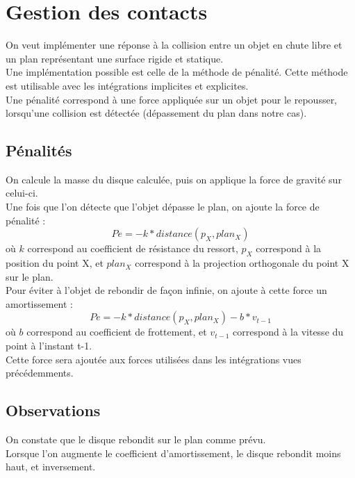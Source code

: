 \documentclass[a4paper]{article}
\begin{document}
\section{Gestion des contacts}

On veut implémenter une réponse à la collision entre un objet en chute libre et un plan représentant une surface rigide et statique.\\

Une implémentation possible est celle de la méthode de pénalité. Cette méthode est utilisable avec les intégrations implicites et explicites.\\

Une pénalité correspond à une force appliquée sur un objet pour le repousser, lorsqu'une collision est détectée (dépassement du plan dans notre cas).

\subsection{Pénalités}

On calcule la masse du disque calculée, puis on applique la force de gravité sur celui-ci.\\

Une fois que l'on détecte que l'objet dépasse le plan, on ajoute la force de pénalité :
\begin{equation}
  Pe = -k * distance(p_X, plan_X)
\end{equation}
où $k$ correspond au coefficient de résistance du ressort, $p_X$ correspond à la position du point X, et $plan_X$ correspond à la projection orthogonale du point X sur le plan.\\

Pour éviter à l'objet de rebondir de façon infinie, on ajoute à cette force un amortissement :
\begin{equation}
  Pe = -k * distance(p_X, plan_X) - b * v_{t-1}
\end{equation}
où $b$ correspond au coefficient de frottement, et $v_{t-1}$ correspond à la vitesse du point à l'instant t-1.\\

Cette force sera ajoutée aux forces utilisées dans les intégrations vues précédemments.

\subsection{Observations}

On constate que le disque rebondit sur le plan comme prévu.\\
Lorsque l'on augmente le coefficient d'amortissement, le disque rebondit moins haut, et inversement.
\end{document}
